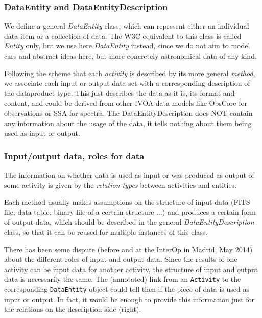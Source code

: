 
\subsubsection{DataEntity and DataEntityDescription}
We define a general \emph{DataEntity} class, 
which can represent either an individual data item or a collection of data. The W3C equivalent to this class is called \emph{Entity} only, but we use here \emph{DataEntity} instead, since we do not aim to model cars and abstract ideas here, but more concretely astronomical data of any kind.


Following the scheme that each \emph{activity} is described
by its more general \emph{method}, we associate each input or
output data set with a corresponding description of the dataproduct type. 
This just describes the data as it is, its format and content, and could be derived
from other IVOA data models like ObsCore for observations or SSA for spectra.
The DataEntityDescription does NOT contain any information about the usage of the data, 
it tells nothing about them being used as input or output.

\subsubsection{Input/output data, roles for data}
The information on whether data is used as input or was produced as output of 
some activity is given by the \emph{relation-types} between activities and entities.

Each method usually makes assumptions on the structure of input data (FITS file, data
table, binary file of a certain structure ...) and produces a certain form of
output data, which should be described in the general \emph{DataEntityDescription}
class, so that it can be reused for multiple instances of this class.

There has been some dispute (before and at the InterOp in Madrid, May 2014) 
about the different roles of input and output data. Since the results of one 
activity can be input data for
another activity, the structure of input and output data is necessarily the same.
The (annotated) link from an \texttt{Activity} to the corresponding \texttt{DataEntity}
object could tell then if the piece of data is used as input or output. In fact, 
it would be enough to provide this information just for the relations on the description side (right).


